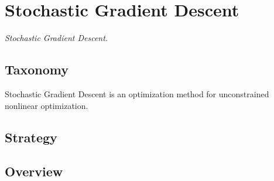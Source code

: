 
\section{Stochastic Gradient Descent} 
\label{sec:stochastic_gradient_descent}

\emph{Stochastic Gradient Descent.}

\subsection{Taxonomy}
Stochastic Gradient Descent is an optimization method for unconstrained nonlinear optimization.

\subsection{Strategy}


\subsection{Overview}

